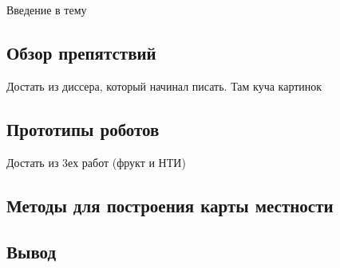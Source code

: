 
Введение в тему


\subsection{Обзор
препятствий}

Достать из диссера, который начинал писать. Там куча картинок


\subsection{Прототипы
роботов}

Достать из 3ех работ (фрукт и НТИ)


\subsection{Методы для построения карты
местности}


\subsection{Вывод}